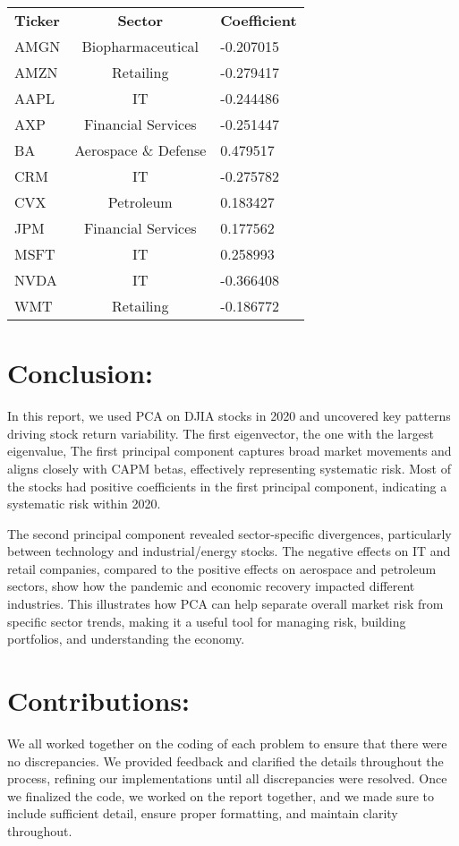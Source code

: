 \documentclass{report}
\begin{document}
\begin{table}[h]
    \centering
    \begin{tabular}{l c l}
        \textbf{Ticker} & \textbf{Sector} & \textbf{Coefficient} \\
        AMGN & Biopharmaceutical & -0.207015 \\
        AMZN & Retailing & -0.279417 \\
        AAPL & IT & -0.244486 \\
        AXP  & Financial Services & -0.251447 \\
        BA   & Aerospace \& Defense & 0.479517 \\
        CRM  & IT & -0.275782 \\
        CVX  & Petroleum & 0.183427 \\
        JPM  & Financial Services & 0.177562 \\
        MSFT & IT & 0.258993 \\
        NVDA & IT & -0.366408 \\
        WMT  & Retailing & -0.186772 \\
    \end{tabular}
\end{table}


\newpage

\section*{Conclusion:}
In this report,  we used PCA on DJIA stocks in 2020 and uncovered key patterns driving stock return variability. The first eigenvector, the one with the largest eigenvalue, The first principal component captures broad market movements and aligns closely with CAPM betas, effectively representing systematic risk. Most of the stocks had positive coefficients in the first principal component, indicating a systematic risk within 2020.

The second principal component revealed sector-specific divergences, particularly between technology and industrial/energy stocks. The negative effects on IT and retail companies, compared to the positive effects on aerospace and petroleum sectors, show how the pandemic and economic recovery impacted different industries. This illustrates how PCA can help separate overall market risk from specific sector trends, making it a useful tool for managing risk, building portfolios, and understanding the economy.


\section*{Contributions:}
We all worked together on the coding of each problem to ensure that there were no discrepancies. We provided feedback and clarified the details throughout the process, refining our implementations until all discrepancies were resolved. Once we finalized the code, we worked on the report together, and we made sure to include sufficient detail, ensure proper formatting, and maintain clarity throughout.

\pagebreak
\end{document}
